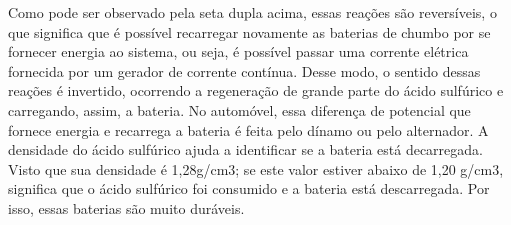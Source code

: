 Como pode ser observado pela seta dupla acima, essas reações são reversíveis, o que significa que é possível recarregar novamente as baterias de chumbo por se fornecer energia ao sistema, ou seja, é possível passar uma corrente elétrica fornecida por um gerador de corrente contínua. Desse modo, o sentido dessas reações é invertido, ocorrendo a regeneração de grande parte do ácido sulfúrico e carregando, assim, a bateria. No automóvel, essa diferença de potencial que fornece energia e recarrega a bateria é feita pelo dínamo ou pelo alternador.
A densidade do ácido sulfúrico ajuda a identificar se a bateria está decarregada. Visto que sua densidade é 1,28g/cm3; se este valor estiver abaixo de 1,20 g/cm3, significa que o ácido sulfúrico foi consumido e a bateria está descarregada. Por isso, essas baterias são muito duráveis.

